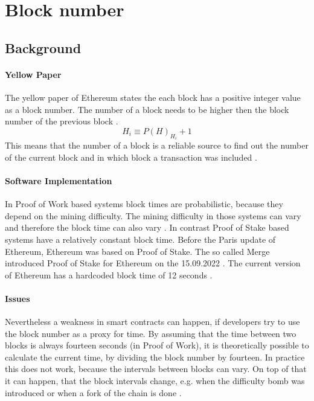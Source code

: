 \section{Block number}

\subsection{Background}

\paragraph{Yellow Paper}
The yellow paper of Ethereum states the each block has a positive integer value as a block number.
The number of a block needs to be higher then the block number of the previous block \cite{ethyellowpaper2023}.
\begin{equation} \label{eq:blocknumber}
    H_i \equiv P(H)_{H_i} + 1
\end{equation}
This means that the number of a block is a reliable source to find out 
the number of the current block and in which block a transaction was included \cite{eth_blocks}.

\paragraph{Software Implementation}
In Proof of Work based systems block times are probabilistic, because they depend on the mining difficulty.
The mining difficulty in those systems can vary and therefore the block time can also vary \cite{eth_blocks}. \newline
In contrast Proof of Stake based systems have a relatively constant block time.
Before the Paris update of Ethereum, Ethereum was based on Proof of Stake. The so called Merge introduced Proof of Stake for Ethereum
on the 15.09.2022 \cite{eth_history}. The current version of Ethereum has a hardcoded block time of 12 seconds \cite{eth_blocks}. \newline

\paragraph{Issues}
Nevertheless a weakness in smart contracts can happen, if developers try to use the block number as a proxy for time.
By assuming that the time between two blocks is always fourteen seconds (in Proof of Work), it is theoretically possible to
calculate the current time, by dividing the block number by fourteen. In practice this does not work,
because the intervals between blocks can vary. On top of that it can happen, that the
block intervals change, e.g. when the difficulty bomb was introduced or when a fork of the chain is done \cite{swc116}.

